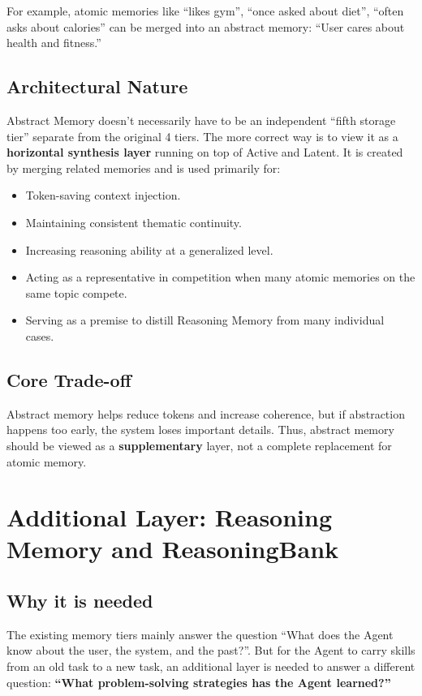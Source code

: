 \documentclass[a4paper,12pt]{article}
\begin{document}
For example, atomic memories like ``likes gym'', ``once asked about diet'', ``often asks about calories'' can be merged into an abstract memory: ``User cares about health and fitness.''

\subsection*{Architectural Nature}

Abstract Memory doesn't necessarily have to be an independent ``fifth storage tier'' separate from the original 4 tiers. The more correct way is to view it as a \textbf{horizontal synthesis layer} running on top of Active and Latent. It is created by merging related memories and is used primarily for:
\begin{itemize}
    \item Token-saving context injection.
    \item Maintaining consistent thematic continuity.
    \item Increasing reasoning ability at a generalized level.
    \item Acting as a representative in competition when many atomic memories on the same topic compete.
    \item Serving as a premise to distill Reasoning Memory from many individual cases.
\end{itemize}

\subsection*{Core Trade-off}

Abstract memory helps reduce tokens and increase coherence, but if abstraction happens too early, the system loses important details. Thus, abstract memory should be viewed as a \textbf{supplementary} layer, not a complete replacement for atomic memory.

\section{Additional Layer: Reasoning Memory and ReasoningBank}

\subsection*{Why it is needed}

The existing memory tiers mainly answer the question ``What does the Agent know about the user, the system, and the past?''. But for the Agent to carry skills from an old task to a new task, an additional layer is needed to answer a different question: \textbf{``What problem-solving strategies has the Agent learned?''}
\end{document}
